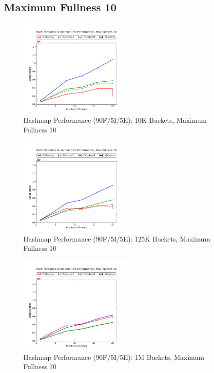\subsection{Maximum Fullness 10}

\begin{figure}[H]
    \centering
    \caption{Hashmap Performance (90F/5I/5E): 10K Buckets, Maximum Fullness 10}
    \includegraphics[width=0.5\textwidth]{maps/10HM10K:F90,I5,E5.png} 
    
\end{figure}

\begin{figure}[H]
    \centering
    \caption{Hashmap Performance (90F/5I/5E): 125K Buckets, Maximum Fullness 10}
    \includegraphics[width=0.5\textwidth]{maps/10HM125K:F90,I5,E5.png} 
    
\end{figure}

\begin{figure}[H]
    \centering
    \caption{Hashmap Performance (90F/5I/5E): 1M Buckets, Maximum Fullness 10}
    \includegraphics[width=0.5\textwidth]{maps/10HM1M:F90,I5,E5.png} 
    
\end{figure}

